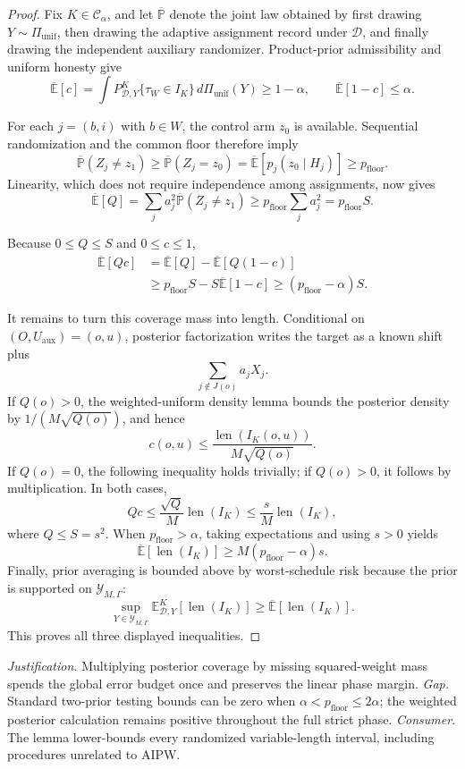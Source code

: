 \documentclass{article}
\begin{document}
\begin{proof}
Fix \(K\in\mathcal C_\alpha\), and let \(\overline{\mathbb P}\) denote the joint law obtained by first drawing \(Y\sim\Pi_{\mathrm{unif}}\), then drawing the adaptive assignment record under \(\mathcal D\), and finally drawing the independent auxiliary randomizer.  Product-prior admissibility and uniform honesty give
\[
 \overline{\mathbb E}[c]
 =\int P^K_{\mathcal D,Y}\{\tau_W\in I_K\}
       \,d\Pi_{\mathrm{unif}}(Y)
 \ge1-\alpha,
 \qquad
 \overline{\mathbb E}[1-c]\le\alpha.
\]

For each \(j=(b,i)\) with \(b\in W\), the control arm \(z_0\) is available.  Sequential randomization and the common floor therefore imply
\[
 \overline{\mathbb P}(Z_j\ne z_1)
 \ge \overline{\mathbb P}(Z_j=z_0)
 =\overline{\mathbb E}\!\left[p_j(z_0\mid H_j)\right]
 \ge p_{\mathrm{floor}}.
\]
Linearity, which does not require independence among assignments, now gives
\[
 \overline{\mathbb E}[Q]
 =\sum_j a_j^2\overline{\mathbb P}(Z_j\ne z_1)
 \ge p_{\mathrm{floor}}\sum_j a_j^2
 =p_{\mathrm{floor}}S.
\]

Because \(0\le Q\le S\) and \(0\le c\le1\),
\[
 \begin{aligned}
 \overline{\mathbb E}[Qc]
 &=\overline{\mathbb E}[Q]
   -\overline{\mathbb E}[Q(1-c)] \\
 &\ge p_{\mathrm{floor}}S-S\overline{\mathbb E}[1-c]
 \ge(p_{\mathrm{floor}}-\alpha)S.
 \end{aligned}
\]

It remains to turn this coverage mass into length.  Conditional on \((O,U_{\mathrm{aux}})=(o,u)\), posterior factorization writes the target as a known shift plus
\[
 \sum_{j\notin J(o)}a_jX_j.
\]
If \(Q(o)>0\), the weighted-uniform density lemma bounds the posterior density by \(1/(M\sqrt{Q(o)})\), and hence
\[
 c(o,u)\le\frac{\operatorname{len}(I_K(o,u))}{M\sqrt{Q(o)}}.
\]
If \(Q(o)=0\), the following inequality holds trivially; if \(Q(o)>0\), it follows by multiplication.  In both cases,
\[
 Qc\le\frac{\sqrt Q}{M}\operatorname{len}(I_K)
 \le\frac{s}{M}\operatorname{len}(I_K),
\]
where \(Q\le S=s^2\).  When \(p_{\mathrm{floor}}>\alpha\), taking expectations and using \(s>0\) yields
\[
 \overline{\mathbb E}[\operatorname{len}(I_K)]
 \ge M(p_{\mathrm{floor}}-\alpha)s.
\]
Finally, prior averaging is bounded above by worst-schedule risk because the prior is supported on \(\mathcal Y_{M,\Gamma}\):
\[
 \sup_{Y\in\mathcal Y_{M,\Gamma}}
 \mathbb E^K_{\mathcal D,Y}[\operatorname{len}(I_K)]
 \ge \overline{\mathbb E}[\operatorname{len}(I_K)].
\]
This proves all three displayed inequalities.
\end{proof}
\par\smallskip\noindent \textit{Justification.} Multiplying posterior coverage by missing squared-weight mass spends the global error budget once and preserves the linear phase margin. \textit{Gap.} Standard two-prior testing bounds can be zero when \(\alpha<p_{\mathrm{floor}}\le2\alpha\); the weighted posterior calculation remains positive throughout the full strict phase. \textit{Consumer.} The lemma lower-bounds every randomized variable-length interval, including procedures unrelated to AIPW.
\end{document}

